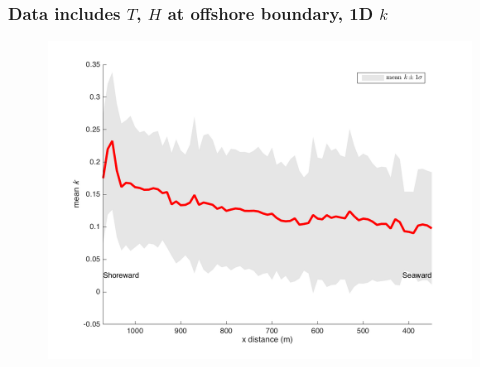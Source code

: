 \documentclass[7pt]{beamer}
\begin{document}
\begin{frame}
	\frametitle{Data includes $T$, $H$ at offshore boundary, 1D $k$}
		\begin{figure}[H]
			\centering
			\includegraphics[width=1\linewidth]{img/k1Dmean_std.png}
		\end{figure}
\end{frame}
\end{document}

